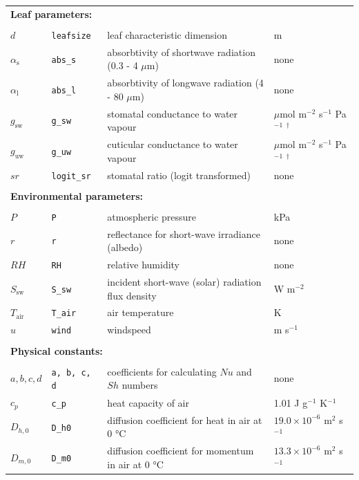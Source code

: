 \documentclass[11pt, oneside]{article}
\newcommand{\code}[1]{{\texttt{#1}}}
\begin{document}
\begin{table}[ht]
\begin{center}
{\begin{tabular}{llll}
  \multicolumn{4}{l}{\textbf{Leaf parameters:}} \\
  \\
  $d$                 & \code{leafsize}  & leaf characteristic dimension & m \\
  $\alpha_\mathrm{s}$ & \code{abs\_s}    & absorbtivity of shortwave radiation (0.3 - 4 $\mu$m) & none \\
  $\alpha_\mathrm{l}$ & \code{abs\_l}    & absorbtivity of longwave radiation (4 - 80 $\mu$m) & none \\
  $g_\mathrm{sw}$     & \code{g\_sw}     & stomatal conductance to water vapour & $\mu$mol m$^{-2}$ s$^{-1}$ Pa$^{-1}$ $^\dagger$ \\
  $g_\mathrm{uw}$     & \code{g\_uw}     & cuticular conductance to water vapour & $\mu$mol m$^{-2}$ s$^{-1}$ Pa$^{-1}$ $^\dagger$ \\
  $\mathit{sr}$       & \code{logit\_sr} & stomatal ratio (logit transformed) & none \\
  \\
  \multicolumn{4}{l}{\textbf{Environmental parameters:}} \\
  \\
  $P$              & \code{P}       & atmospheric pressure & kPa \\
  $r$              & \code{r}       & reflectance for short-wave irradiance (albedo) & none \\
  $\mathit{RH}$    & \code{RH}      & relative humidity    & none \\
  $S_\mathrm{sw}$  & \code{S\_sw}   & incident short-wave (solar) radiation flux density & W m$^{-2}$ \\
  $T_\mathrm{air}$ & \code{T\_air}  & air temperature      & K \\
  $u$              & \code{wind}    & windspeed            & m s$^{-1}$ \\
  \\
  \multicolumn{4}{l}{\textbf{Physical constants:}} \\
  \\
  $a, b, c, d$     & \code{a, b, c, d} & coefficients for calculating $\mathit{Nu}$ and $\mathit{Sh}$ numbers & none \\
  $c_p$            & \code{c\_p}    & heat capacity of air & 1.01 J g$^{-1}$ K$^{-1}$ \\
  $D_{h,0}$        & \code{D\_h0}   & diffusion coefficient for heat in air at 0 °C & $19.0 \times 10^{-6}$ m$^2$ s$^{-1}$ \\
  $D_{m,0}$        & \code{D\_m0}   & diffusion coefficient for momentum in air at 0 °C & $13.3 \times 10^{-6}$ m$^2$ s$^{-1}$ \\

\end{tabular}}
\end{center}
\end{table}
\end{document}
